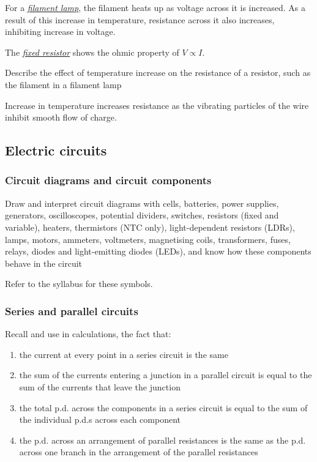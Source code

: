 For a \ul{\emph{filament lamp}}, the filament heats up as voltage across it is increased. As a result of this
increase in temperature, resistance across it also increases, inhibiting increase in voltage.

The \ul{\emph{fixed resistor}} shows the ohmic property of $V \propto I$.

\begin{point}
Describe the effect of temperature increase on the resistance of a resistor, such as the filament in a 
filament lamp
\end{point}

Increase in temperature increases resistance as the vibrating particles of the wire inhibit
smooth flow of charge.

\subsection{Electric circuits}
\subsubsection{Circuit diagrams and circuit components}

\begin{subpoint}
Draw and interpret circuit diagrams with cells, batteries, power supplies, generators, oscilloscopes, 
potential dividers, switches, resistors (fixed and variable), heaters, thermistors (NTC only), light-dependent 
resistors (LDRs), lamps, motors, ammeters, voltmeters, magnetising coils, transformers, fuses, relays, 
diodes and light-emitting diodes (LEDs), and know how these components behave in the circuit
\end{subpoint}

Refer to the syllabus for these symbols.

\subsubsection{Series and parallel circuits}
\begin{subpoint}
Recall and use in calculations, the fact that:
\begin{enumerate}[label=(\alph*)]
	\setlength\itemsep{0em}
	\item the current at every point in a series circuit is the same
	\item the sum of the currents entering a junction in a parallel circuit is equal to the sum of the currents that 
		leave the junction
	\item the total p.d. across the components in a series circuit is equal to the sum of the individual p.d.s across 
		each component
	\item the p.d. across an arrangement of parallel resistances is the same as the p.d. across one branch in the 
		arrangement of the parallel resistances
\end{enumerate}
\end{subpoint}

